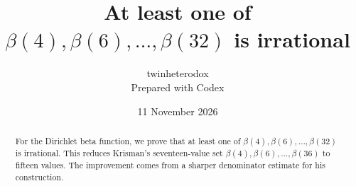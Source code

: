 \documentclass[11pt]{article}
\title{At least one of $\beta(4),\beta(6),\ldots,\beta(32)$ is irrational}
\author{twinheterodox\\[2pt]\normalsize Prepared with Codex}
\date{11 November 2026}
\theoremstyle{definition}
\numberwithin{equation}{section}
\begin{document}
\maketitle
\begin{abstract}
For the Dirichlet beta function, we prove that at least one of
$\beta(4),\beta(6),\ldots,\beta(32)$ is irrational. This reduces
Krisman's seventeen-value set $\beta(4),\beta(6),\ldots,\beta(36)$
\cite{krisman} to fifteen values. The improvement comes from a sharper
denominator estimate for his construction.
\end{abstract}






\appendix


\end{document}
